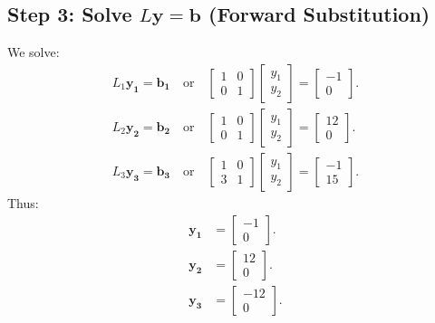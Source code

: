 \documentclass{beamer}
\theoremstyle{remark}
\numberwithin{equation}{section}
\begin{document}
\begin{frame}[fragile]
    	\subsection*{Step 3: Solve $L\mathbf{y} = \mathbf{b}$ (Forward Substitution)}
	We solve:
	\begin{align}
		L_1\mathbf{y_1} = \mathbf{b_1} \quad \text{or} \quad \begin{bmatrix} 1 & 0 \\ 0 & 1 \end{bmatrix} \begin{bmatrix} y_1 \\ y_2 \end{bmatrix} = \begin{bmatrix} -1 \\ 0 \end{bmatrix}.\\
        L_2\mathbf{y_2} = \mathbf{b_2} \quad \text{or} \quad \begin{bmatrix} 1 & 0 \\ 0 & 1 \end{bmatrix} \begin{bmatrix} y_1 \\ y_2 \end{bmatrix} = \begin{bmatrix} 12 \\ 0 \end{bmatrix}.\\
        L_3\mathbf{y_3} = \mathbf{b_3} \quad \text{or} \quad \begin{bmatrix} 1 & 0 \\ 3 & 1 \end{bmatrix} \begin{bmatrix} y_1 \\ y_2 \end{bmatrix} = \begin{bmatrix} -1 \\ 15 \end{bmatrix}.
	\end{align}
	Thus:
	\begin{align}
		\mathbf{y_1} &= \begin{bmatrix} -1 \\ 0 \end{bmatrix}.\\
        \mathbf{y_2} &= \begin{bmatrix} 12 \\ 0 \end{bmatrix}.\\
        \mathbf{y_3} &= \begin{bmatrix} -12 \\ 0 \end{bmatrix}.\\
	\end{align}
\end{frame}
\end{document}
